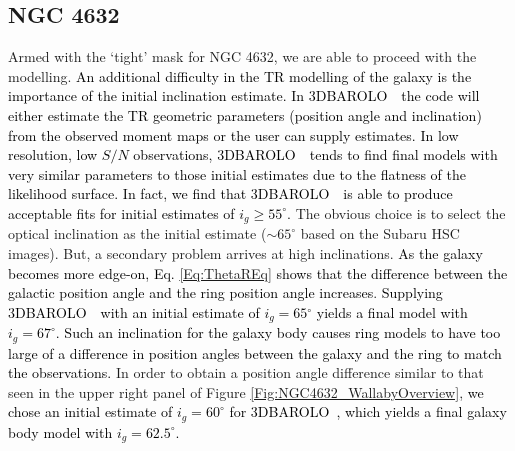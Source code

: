 \documentclass[fleqn,usenatbib]{mnras}
\newcommand{\barolo}{\textsc{3DBAROLO}~}
\begin{document}
\subsection{NGC 4632}\label{SubSec:NGC4632Kinematics}

Armed with the `tight' mask for NGC 4632, we are able to proceed with the modelling.  \textcolor{black}{An additional difficulty in the TR modelling of the galaxy is the importance of the initial inclination estimate.  In \barolo\ the code will either estimate the TR geometric parameters (position angle and inclination) from the observed moment maps or the user can supply estimates.  In low resolution, low $S/N$ observations, \barolo\ tends to find final models with very similar parameters to those initial estimates due to the flatness of the likelihood surface.  In fact, we find that \barolo\ is able to produce acceptable fits for initial estimates of $i_{g}\ge55^{\circ}$.}  The obvious choice is to select the optical inclination as the initial estimate ($\sim65^{\circ}$ based on the Subaru HSC images).  But, a secondary problem arrives at high inclinations. \textcolor{black}{As the galaxy becomes more edge-on, Eq. \ref{Eq:ThetaREq} shows that the difference between the galactic position angle and the ring position angle increases}.  \textcolor{black}{Supplying \barolo\ with an initial estimate of $i_{g}=65{^\circ}$ yields a final model with $i_{g}=67^{\circ}$.  Such an inclination for the galaxy body causes ring models to have too large of a difference in position angles between the galaxy and the ring to match the observations.}  In order to obtain a position angle difference similar to that seen in the upper right panel of Figure \ref{Fig:NGC4632_WallabyOverview}, \textcolor{black}{we chose an initial estimate of $i_{g}=60^{\circ}$ for \barolo, which yields a final galaxy body model with $i_{g}=62.5^{\circ}$.}


\end{document}
